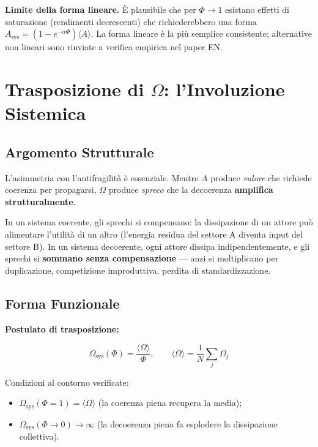 \Conj{} \textbf{Limite della forma lineare.} È plausibile che per
\(\Phi \to 1\) esistano effetti di saturazione (rendimenti decrescenti)
che richiederebbero una forma
\(A_{\text{sys}} = (1 - e^{-\alpha\Phi})\langle A \rangle\). La forma
lineare è la più semplice consistente; alternative non lineari sono
rinviate a verifica empirica nel paper EN.



\section{Trasposizione di $\Omega$: l'Involuzione
Sistemica}\label{trasposizione-di-ux3c9-linvoluzione-sistemica}

\subsection{Argomento Strutturale}\label{argomento-strutturale-1}

L'asimmetria con l'antifragilità è essenziale. Mentre \(A\) produce
\emph{valore} che richiede coerenza per propagarsi, \(\Omega\) produce
\emph{spreco} che la decoerenza \textbf{amplifica strutturalmente}.

In un sistema coerente, gli sprechi si compensano: la dissipazione di un
attore può alimentare l'utilità di un altro (l'energia residua del
settore A diventa input del settore B). In un sistema decoerente, ogni
attore dissipa indipendentemente, e gli sprechi si \textbf{sommano senza
compensazione} --- anzi si moltiplicano per duplicazione, competizione
improduttiva, perdita di standardizzazione.

\subsection{Forma Funzionale}\label{forma-funzionale-1}

\Hypoth{} \textbf{Postulato di trasposizione:}

\[
\Omega_{\text{sys}}(\Phi) = \frac{\langle \Omega \rangle}{\Phi}, \qquad \langle \Omega \rangle = \frac{1}{N}\sum_j \Omega_j
\]

Condizioni al contorno verificate:

\begin{itemize}
\tightlist
\item
  \(\Omega_{\text{sys}}(\Phi = 1) = \langle \Omega \rangle\) (la
  coerenza piena recupera la media);
\item
  \(\Omega_{\text{sys}}(\Phi \to 0) \to \infty\) (la decoerenza piena fa
  esplodere la dissipazione collettiva).
\end{itemize}

